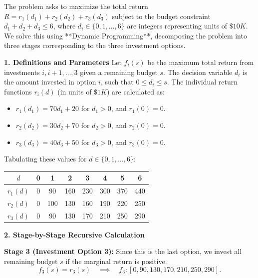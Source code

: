 \begin{solution}
The problem asks to maximize the total return $R = r_1(d_1) + r_2(d_2) + r_3(d_3)$ subject to the budget constraint $d_1 + d_2 + d_3 \leq 6$, where $d_i \in \{0, 1, \dots, 6\}$ are integers representing units of $\$10K$. We solve this using **Dynamic Programming**, decomposing the problem into three stages corresponding to the three investment options.

\noindent \textbf{1. Definitions and Parameters}
Let $f_i(s)$ be the maximum total return from investments $i, i+1, \dots, 3$ given a remaining budget $s$. The decision variable $d_i$ is the amount invested in option $i$, such that $0 \leq d_i \leq s$.
The individual return functions $r_i(d)$ (in units of $\$1K$) are calculated as:
\begin{itemize}
    \item $r_1(d_1) = 70d_1 + 20$ for $d_1 > 0$, and $r_1(0) = 0$.
    \item $r_2(d_2) = 30d_2 + 70$ for $d_2 > 0$, and $r_2(0) = 0$.
    \item $r_3(d_3) = 40d_3 + 50$ for $d_3 > 0$, and $r_3(0) = 0$.
\end{itemize}
Tabulating these values for $d \in \{0, 1, \dots, 6\}$:
\begin{center}
\begin{tabular}{c|ccccccc}
$d$ & 0 & 1 & 2 & 3 & 4 & 5 & 6 \\ \hline
$r_1(d)$ & 0 & 90 & 160 & 230 & 300 & 370 & 440 \\
$r_2(d)$ & 0 & 100 & 130 & 160 & 190 & 220 & 250 \\
$r_3(d)$ & 0 & 90 & 130 & 170 & 210 & 250 & 290 \\
\end{tabular}
\end{center}

\noindent \textbf{2. Stage-by-Stage Recursive Calculation}

\medskip
\noindent \textbf{Stage 3 (Investment Option 3):}
Since this is the last option, we invest all remaining budget $s$ if the marginal return is positive.
\[ f_3(s) = r_3(s) \quad \implies \quad f_3: [0, 90, 130, 170, 210, 250, 290]. \]


\end{solution}
